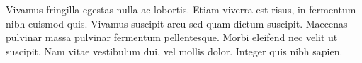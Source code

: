 \documentclass[oneside,openright,titlepage,numbers=noenddot,openany,headinclude,footinclude=true,
cleardoublepage=empty,abstractoff,BCOR=5mm,paper=a4,fontsize=12pt,main=spanish]{scrreprt}
\begin{document}
Vivamus fringilla egestas nulla ac lobortis. Etiam viverra est risus,
in fermentum nibh euismod quis. Vivamus suscipit arcu sed quam dictum
suscipit. Maecenas pulvinar massa pulvinar fermentum
pellentesque. Morbi eleifend nec velit ut suscipit. Nam vitae
vestibulum dui, vel mollis dolor. Integer quis nibh sapien.




   
\end{document}

